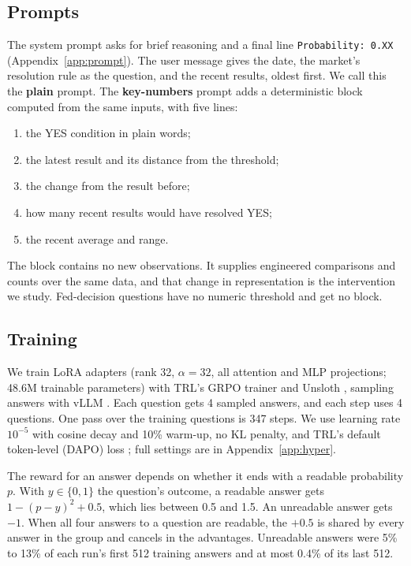 \documentclass[11pt]{article}
\begin{document}
\subsection{Prompts}

The system prompt asks for brief reasoning and a final line \texttt{Probability: 0.XX} (Appendix~\ref{app:prompt}). The user message gives the date, the market's resolution rule as the question, and the recent results, oldest first. We call this the \textbf{plain} prompt. The \textbf{key-numbers} prompt adds a deterministic block computed from the same inputs, with five lines:
\begin{enumerate}[leftmargin=*]
\item the YES condition in plain words;
\item the latest result and its distance from the threshold;
\item the change from the result before;
\item how many recent results would have resolved YES;
\item the recent average and range.
\end{enumerate}
The block contains no new observations. It supplies engineered comparisons and counts over the same data, and that change in representation is the intervention we study. Fed-decision questions have no numeric threshold and get no block.

\subsection{Training}

We train LoRA adapters \citep{hu2022lora} (rank 32, $\alpha=32$, all attention and MLP projections; 48.6M trainable parameters) with TRL's GRPO trainer \citep{vonwerra2020trl} and Unsloth \citep{unsloth}, sampling answers with vLLM \citep{kwon2023vllm}. Each question gets 4 sampled answers, and each step uses 4 questions. One pass over the training questions is 347 steps. We use learning rate $10^{-5}$ with cosine decay and 10\% warm-up, no KL penalty, and TRL's default token-level (DAPO) loss \citep{yu2025dapo}; full settings are in Appendix~\ref{app:hyper}.

The reward for an answer depends on whether it ends with a readable probability $p$. With $y \in \{0,1\}$ the question's outcome, a readable answer gets $1-(p-y)^2 + 0.5$, which lies between 0.5 and 1.5. An unreadable answer gets $-1$. When all four answers to a question are readable, the $+0.5$ is shared by every answer in the group and cancels in the advantages. Unreadable answers were 5\% to 13\% of each run's first 512 training answers and at most 0.4\% of its last 512.
\end{document}
